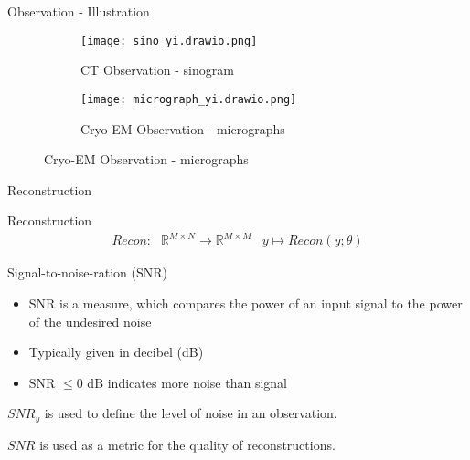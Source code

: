 \begin{frame}{Observation - Illustration }

    \begin{figure}
    \centering
    \begin{subfigure}{0.25\textwidth}
        \texttt{[image: sino\_yi.drawio.png]}
        \caption{CT Observation - sinogram}
    \end{subfigure}
    \begin{subfigure}{0.6\textwidth}
        \texttt{[image: micrograph\_yi.drawio.png]}
        \caption{Cryo-EM Observation - micrographs}
    \end{subfigure}
\end{figure}

\end{frame}


\begin{frame}{Reconstruction}
    \pause
  
    \begin{block}{Reconstruction}
        \begin{equation}
            \begin{aligned}
                \textit{Recon} : & \mathbb{R}^{M \times N} \to \mathbb{R}^{M \times M} & y \mapsto Recon(y; \theta)
            \end{aligned}
        \end{equation}
    \end{block}
\end{frame}



\begin{frame}{Signal-to-noise-ration (SNR)}
    \pause
    \begin{itemize}
        \item SNR is a measure, which compares the power of an input signal to the power of the undesired noise
        \item Typically given in decibel (dB)
        \item SNR $\le 0$ dB indicates more noise than signal 
    \end{itemize}


    \begin{tcolorbox}[colback=red!5!white,hide=<1-2>, alert=<3>, colframe=red!75!black]
        $SNR_y$ is used to define the level of noise in an observation.
    \end{tcolorbox}

        
    \begin{tcolorbox}[colback=red!5!white,hide=<1-3>, alert=<4>, colframe=red!75!black]
        $SNR$ is used as a metric for the quality of reconstructions.
    \end{tcolorbox}

\end{frame}



